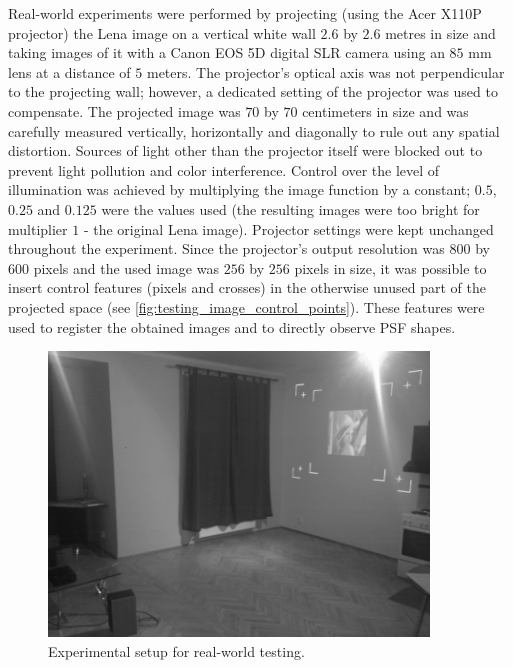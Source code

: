 \documentclass[12pt,notitlepage]{report}
\begin{document}
Real-world experiments were performed by projecting (using the Acer X110P projector) the Lena image on a vertical white wall $2.6$ by $2.6$ metres in size and taking images of it with a Canon EOS 5D digital SLR camera using an $85$ mm lens at a distance of $5$ meters. The projector's optical axis was not perpendicular to the projecting wall; however, a dedicated setting of the projector was used to compensate. The projected image was $70$ by $70$ centimeters in size and was carefully measured vertically, horizontally and diagonally to rule out any spatial distortion.  Sources of light other than the projector itself were blocked out to prevent light pollution and color interference. Control over the level of illumination was achieved by multiplying the image function by a constant; $0.5$, $0.25$ and $0.125$ were the values used (the resulting images were too bright for multiplier $1$ - the original Lena image). Projector settings were kept unchanged throughout the experiment. Since the projector's output resolution was $800$ by $600$ pixels and the used image was $256$ by $256$ pixels in size, it was possible to insert control features (pixels and crosses) in the otherwise unused part of the projected space (see \ref{fig:testing_image_control_points}). These features were used to register the obtained images and to directly observe PSF shapes. 
\begin{figure}[h]
 \centering
  \includegraphics[width=0.9\textwidth]{testing_setup.png}
 \caption[Experimental setup for real-world testing]{Experimental setup for real-world testing.}
 \label{fig:testing_setup}
\end{figure}
\end{document}
